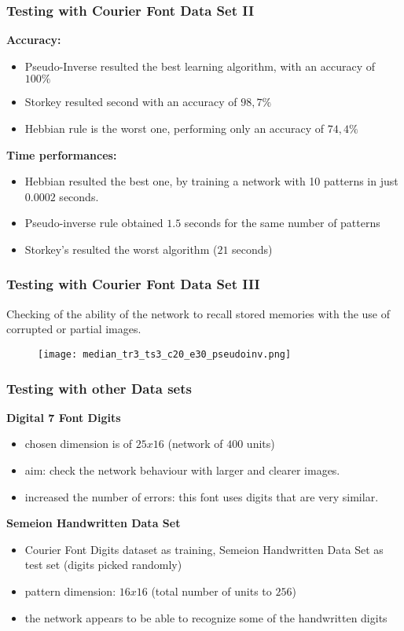 \documentclass{beamer}
\begin{document}

\begin{frame}
\frametitle{Testing with Courier Font Data Set II}
\textbf{Accuracy:}
\begin{itemize}
\item Pseudo-Inverse resulted the best learning algorithm, with an accuracy of $100\%$
\item Storkey resulted second with an accuracy of $98,7\%$
\item Hebbian rule is the worst one, performing only an accuracy of $74,4\%$
\end{itemize}
\textbf{Time performances:} 
\begin{itemize}
\item Hebbian resulted the best one, by training a network with 10 patterns in just $0.0002$ seconds. 
\item Pseudo-inverse rule obtained $1.5$ seconds for the same number of patterns
\item Storkey's resulted the worst algorithm ($21$ seconds)
\end{itemize}
\end{frame}


\begin{frame}
\frametitle{Testing with Courier Font Data Set III}
Checking of the ability of the network to recall stored memories with the use of corrupted or partial images.
\begin{figure}
\texttt{[image: median\_tr3\_ts3\_c20\_e30\_pseudoinv.png]}
\end{figure}
\end{frame}


\begin{frame}
\frametitle{Testing with other Data sets}
\textbf{Digital 7 Font Digits}
\begin{itemize}
\item chosen dimension is of $25x16$ (network of $400$ units) 
\item aim: check the network behaviour with larger and clearer images. 
\item increased the number of errors: this font uses digits that are very similar. 
\end{itemize} 
\textbf{Semeion Handwritten Data Set}
\begin{itemize}
\item Courier Font Digits dataset as training, Semeion Handwritten Data Set as test set (digits picked randomly)
\item pattern dimension: $16x16$ (total number of units to $256$)
\item the network appears to be able to recognize some of the handwritten digits
\end{itemize}
\end{frame}
\end{document}
